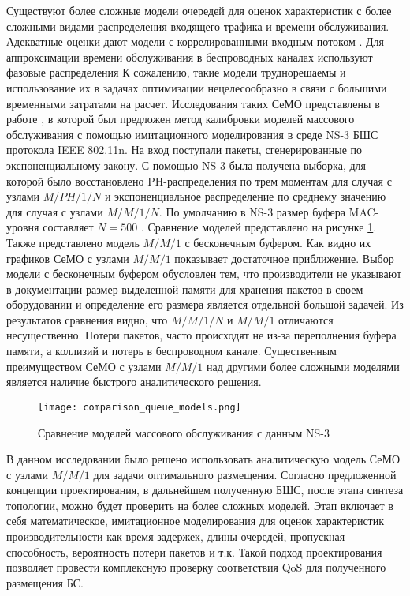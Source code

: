
Существуют более сложные модели очередей для оценок характеристик с более сложными видами распределения входящего трафика и времени обслуживания. Адекватные оценки дают модели с коррелированными входным потоком \cite{VishnevskyDudin2017, Vishnevsky2017, Vishnevsky2016_Methods_of_performance, Larionov2019}. Для аппроксимации времени обслуживания в беспроводных каналах используют фазовые распределения \cite{Vishnevsky2017, Vishnevsky2016_Methods_of_performance, Larionov2019, Kawanishi2019, Dogan2021} К сожалению, такие модели труднорешаемы и использование их в задачах оптимизации нецелесообразно в связи с большими временными затратами на расчет. Исследования таких СеМО представлены в работе \cite{Larionov2021}, в которой был предложен метод калибровки моделей массового обслуживания с помощью имитационного моделирования в среде NS-3 БШС протокола IEEE 802.11n. На вход поступали пакеты, сгенерированные по экспоненциальному закону. С помощью NS-3 была получена выборка, для которой было восстановлено PH-распределения по трем моментам для случая с узлами $M/PH/1/N$ и экспоненциальное распределение по среднему значению для случая с узлами $M/M/1/N$. По умолчанию в NS-3 размер буфера MAC-уровня составляет $N=500$ \cite{ns-3}. Сравнение моделей представлено на рисунке \cref{fig:comparison_queue_models}. Также представлено модель $M/M/1$ с бесконечным буфером. Как видно их графиков СеМО с узлами $M/M/1$ показывает достаточное приближение. Выбор модели с бесконечным буфером обусловлен тем, что производители не указывают в документации размер выделенной памяти для хранения пакетов в своем оборудовании и определение его размера является отдельной большой задачей. Из результатов сравнения видно, что $M/M/1/N$ и $M/M/1$ отличаются несущественно. Потери пакетов, часто происходят не из-за переполнения буфера памяти, а коллизий и потерь в беспроводном канале. Существенным преимуществом СеМО с узлами $M/M/1$ над другими более сложными моделями является наличие быстрого аналитического решения.

\begin{figure}[h!]
  \centering
   \texttt{[image: comparison\_queue\_models.png]}
\caption{Сравнение моделей массового обслуживания с данным NS-3}
\label{fig:comparison_queue_models}
\end{figure}

В данном исследовании было решено использовать аналитическую модель СеМО с узлами $M/M/1$ для задачи оптимального размещения. Согласно предложенной концепции проектирования, в дальнейшем полученную БШС, после этапа синтеза топологии, можно будет проверить на более сложных моделей. Этап  включает в себя математическое, имитационное моделирования для оценок характеристик производительности как время задержек, длины очередей, пропускная способность, вероятность потери пакетов и т.к. Такой подход проектирования позволяет провести комплексную проверку соответствия QoS для полученного размещения БС.

